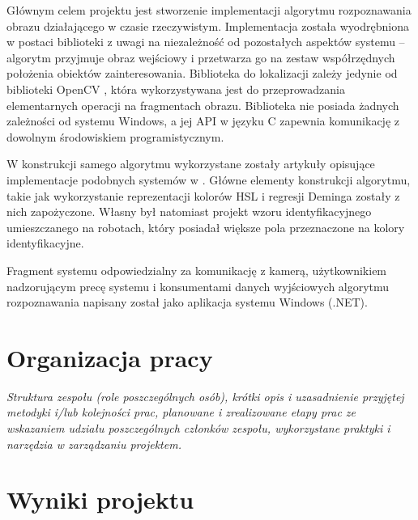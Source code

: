 \documentclass[polish,12pt]{aghthesis}
\begin{document}

Głównym celem projektu jest stworzenie implementacji algorytmu rozpoznawania
obrazu działającego w czasie rzeczywistym. Implementacja została wyodrębniona
w postaci biblioteki z uwagi na niezależność od pozostałych aspektów systemu --
algorytm przyjmuje obraz wejściowy i przetwarza go na zestaw współrzędnych
położenia obiektów zainteresowania. Biblioteka do lokalizacji zależy jedynie od 
biblioteki OpenCV \cite{opencv}, która wykorzystywana jest do przeprowadzania 
elementarnych operacji na fragmentach obrazu. Biblioteka nie posiada żadnych 
zależności od systemu Windows, a jej API w języku C zapewnia komunikację z 
dowolnym środowiskiem programistycznym.

W konstrukcji samego algorytmu wykorzystane zostały artykuły opisujące 
implementacje podobnych systemów w \cite{largeleague} \cite{exemplary}
\cite{colortag}. Główne elementy konstrukcji algorytmu, takie jak wykorzystanie
reprezentacji kolorów HSL i regresji Deminga zostały z nich zapożyczone. Własny
był natomiast projekt wzoru identyfikacyjnego umieszczanego na robotach, który
posiadał większe pola przeznaczone na kolory identyfikacyjne.

Fragment systemu odpowiedzialny za komunikację z kamerą, użytkownikiem 
nadzorującym precę systemu i konsumentami danych 
wyjściowych algorytmu rozpoznawania napisany został jako aplikacja systemu 
Windows (.NET). 


\cite{mshift}





\section{Organizacja pracy}
\label{sec:organizacja-pracy}

\emph{Struktura zespołu (role poszczególnych osób), krótki opis i
  uzasadnienie przyjętej metodyki i/lub kolejności prac, planowane i
  zrealizowane etapy prac ze wskazaniem udziału poszczególnych
  członków zespołu, wykorzystane praktyki i narzędzia w zarządzaniu
  projektem.}

\section{Wyniki projektu}
\end{document}
